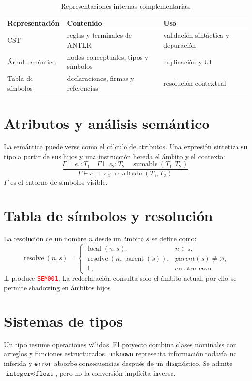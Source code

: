 \documentclass[11pt,letterpaper,oneside]{report}
\newcommand{\codigo}[1]{\texttt{#1}}
\newcommand{\diag}[1]{\textcolor{red}{\texttt{#1}}}
\begin{document}
\begin{table}[H]
\centering
\begin{tabularx}{\textwidth}{lYY}
\toprule
Representación & Contenido & Uso \\
\midrule
CST & reglas y terminales de ANTLR & validación sintáctica y depuración \\
Árbol semántico & nodos conceptuales, tipos y símbolos & explicación y UI \\
Tabla de símbolos & declaraciones, firmas y referencias & resolución contextual \\
\bottomrule
\end{tabularx}
\caption{Representaciones internas complementarias.}
\end{table}

\section{Atributos y análisis semántico}

La semántica puede verse como el cálculo de atributos. Una expresión sintetiza su
tipo a partir de sus hijos y una instrucción hereda el ámbito y el contexto:
\[
\frac{\Gamma\vdash e_1:T_1 \quad \Gamma\vdash e_2:T_2
      \quad \operatorname{sumable}(T_1,T_2)}
     {\Gamma\vdash e_1+e_2:\operatorname{resultado}(T_1,T_2)}.
\]
\(\Gamma\) es el entorno de símbolos visible.

\section{Tabla de símbolos y resolución}

La resolución de un nombre \(n\) desde un ámbito \(s\) se define como:
\[
\operatorname{resolve}(n,s)=
\begin{cases}
\operatorname{local}(n,s), & n\in s,\\
\operatorname{resolve}(n,\operatorname{parent}(s)), & parent(s)\neq\varnothing,\\
\bot, & \text{en otro caso}.
\end{cases}
\]
\(\bot\) produce \diag{SEM001}. La redeclaración consulta solo el ámbito actual; por
ello se permite shadowing en ámbitos hijos.

\section{Sistemas de tipos}

Un tipo resume operaciones válidas. El proyecto combina clases nominales con arreglos
y funciones estructurados. \codigo{unknown} representa información todavía no
inferida y \codigo{error} absorbe consecuencias después de un diagnóstico. Se admite
\(\codigo{integer}\preceq\codigo{float}\), pero no la conversión implícita inversa.
\end{document}
